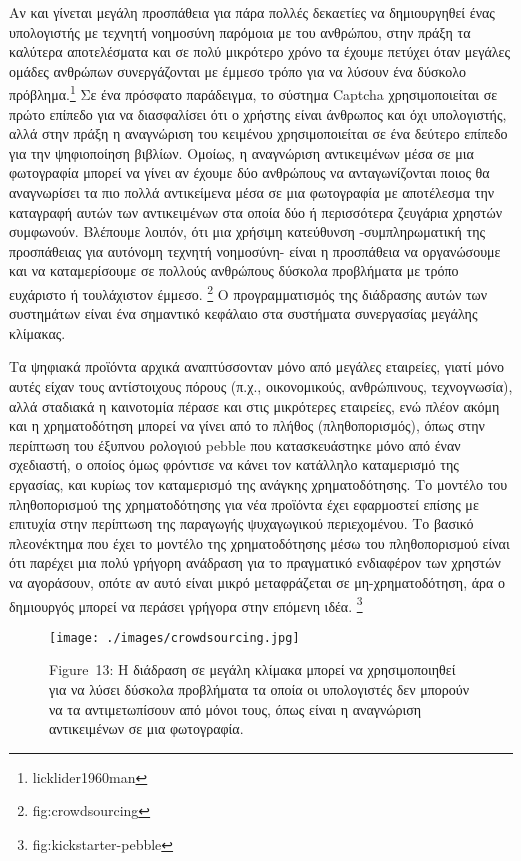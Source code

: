 \documentclass[
]{article}
\begin{document}
Αν και γίνεται μεγάλη προσπάθεια για πάρα πολλές δεκαετίες να
δημιουργηθεί ένας υπολογιστής με τεχνητή νοημοσύνη παρόμοια με του
ανθρώπου, στην πράξη τα καλύτερα αποτελέσματα και σε πολύ μικρότερο
χρόνο τα έχουμε πετύχει όταν μεγάλες ομάδες ανθρώπων συνεργάζονται με
έμμεσο τρόπο για να λύσουν ένα δύσκολο πρόβλημα.\footnote{licklider1960man}
Σε ένα πρόσφατο παράδειγμα, το σύστημα Captcha χρησιμοποιείται σε πρώτο
επίπεδο για να διασφαλίσει ότι ο χρήστης είναι άνθρωπος και όχι
υπολογιστής, αλλά στην πράξη η αναγνώριση του κειμένου χρησιμοποιείται
σε ένα δεύτερο επίπεδο για την ψηφιοποίηση βιβλίων. Ομοίως, η αναγνώριση
αντικειμένων μέσα σε μια φωτογραφία μπορεί να γίνει αν έχουμε δύο
ανθρώπους να ανταγωνίζονται ποιος θα αναγνωρίσει τα πιο πολλά
αντικείμενα μέσα σε μια φωτογραφία με αποτέλεσμα την καταγραφή αυτών των
αντικειμένων στα οποία δύο ή περισσότερα ζευγάρια χρηστών συμφωνούν.
Βλέπουμε λοιπόν, ότι μια χρήσιμη κατεύθυνση -συμπληρωματική της
προσπάθειας για αυτόνομη τεχνητή νοημοσύνη- είναι η προσπάθεια να
οργανώσουμε και να καταμερίσουμε σε πολλούς ανθρώπους δύσκολα προβλήματα
με τρόπο ευχάριστο ή τουλάχιστον έμμεσο. \footnote{fig:crowdsourcing} Ο
προγραμματισμός της διάδρασης αυτών των συστημάτων είναι ένα σημαντικό
κεφάλαιο στα συστήματα συνεργασίας μεγάλης κλίμακας.

Τα ψηφιακά προϊόντα αρχικά αναπτύσσονταν μόνο από μεγάλες εταιρείες,
γιατί μόνο αυτές είχαν τους αντίστοιχους πόρους (π.χ., οικονομικούς,
ανθρώπινους, τεχνογνωσία), αλλά σταδιακά η καινοτομία πέρασε και στις
μικρότερες εταιρείες, ενώ πλέον ακόμη και η χρηματοδότηση μπορεί να
γίνει από το πλήθος (πληθοπορισμός), όπως στην περίπτωση του έξυπνου
ρολογιού pebble που κατασκευάστηκε μόνο από έναν σχεδιαστή, ο οποίος
όμως φρόντισε να κάνει τον κατάλληλο καταμερισμό της εργασίας, και
κυρίως τον καταμερισμό της ανάγκης χρηματοδότησης. Το μοντέλο του
πληθοπορισμού της χρηματοδότησης για νέα προϊόντα έχει εφαρμοστεί επίσης
με επιτυχία στην περίπτωση της παραγωγής ψυχαγωγικού περιεχομένου. Το
βασικό πλεονέκτημα που έχει το μοντέλο της χρηματοδότησης μέσω του
πληθοπορισμού είναι ότι παρέχει μια πολύ γρήγορη ανάδραση για το
πραγματικό ενδιαφέρον των χρηστών να αγοράσουν, οπότε αν αυτό είναι
μικρό μεταφράζεται σε μη-χρηματοδότηση, άρα ο δημιουργός μπορεί να
περάσει γρήγορα στην επόμενη ιδέα. \footnote{fig:kickstarter-pebble}

\leavevmode{}%
\begin{figure}
\hypertarget{fig:crowdsourcing}{%
\centering
\texttt{[image: ./images/crowdsourcing.jpg]}
\caption{Figure~13: Η διάδραση σε μεγάλη κλίμακα μπορεί να
χρησιμοποιηθεί για να λύσει δύσκολα προβλήματα τα οποία οι υπολογιστές
δεν μπορούν να τα αντιμετωπίσουν από μόνοι τους, όπως είναι η αναγνώριση
αντικειμένων σε μια φωτογραφία.}\label{fig:crowdsourcing}
}
\end{figure}
\end{document}
